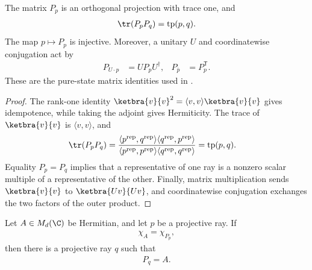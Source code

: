 \begin{theorem}
    \label{thm:projective_pure_state_bridge}
    \leanok
    The matrix $P_p$ is an orthogonal projection with trace one, and
    \begin{align}
        \tr(P_pP_q)=\operatorname{tp}(p,q).
    \end{align}
    The map $p\mapsto P_p$ is injective. Moreover, a unitary $U$ and
    coordinatewise conjugation act by
    \begin{align}
        P_{U\cdot p}&=UP_pU^\dagger,
        &
        P_{\overline p}&=P_p^{\mathsf T}.
    \end{align}
    These are the pure-state matrix identities used in
    \cite[Chapter~1, Wigner's theorem]{Wolf2012Quantum}.
\end{theorem}

\begin{proof}\leanok
    The rank-one identity
    $\ketbra{v}{v}^2=\langle v,v\rangle\ketbra{v}{v}$ gives idempotence,
    while taking the adjoint gives Hermiticity. The trace of
    $\ketbra{v}{v}$ is $\langle v,v\rangle$, and
    \begin{align}
        \tr(P_pP_q)
        &=\frac{\langle p^{\mathrm{rep}},q^{\mathrm{rep}}\rangle
          \langle q^{\mathrm{rep}},p^{\mathrm{rep}}\rangle}
        {\langle p^{\mathrm{rep}},p^{\mathrm{rep}}\rangle
          \langle q^{\mathrm{rep}},q^{\mathrm{rep}}\rangle}
        =\operatorname{tp}(p,q).
    \end{align}
    Equality $P_p=P_q$ implies that a representative of one ray is a
    nonzero scalar multiple of a representative of the other. Finally,
    matrix multiplication sends $\ketbra{v}{v}$ to
    $\ketbra{Uv}{Uv}$, and coordinatewise conjugation exchanges the two
    factors of the outer product.
\end{proof}

\begin{theorem}
    \label{thm:pure_state_matrix_of_hermitian_charpoly_eq}
    \leanok
    Let $A\in M_d(\C)$ be Hermitian, and let $p$ be a projective ray. If
    \begin{align}
        \chi_A=\chi_{P_p},
    \end{align}
    then there is a projective ray $q$ such that
    \begin{align}
        P_q=A.
    \end{align}
\end{theorem}

